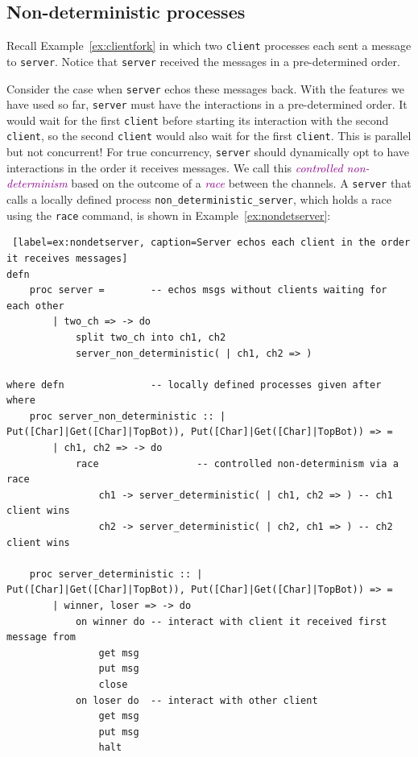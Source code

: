 \documentclass[acmsmall]{acmart}
\newcommand{\tc}[1]{\textcolor{darkMagenta}{\textit{#1}}}
\begin{document}
\subsection{Non-deterministic processes}
\label{Sec:races}

Recall Example~\ref{ex:clientfork} in which two \lstinline$client$ processes each sent a message to \lstinline$server$. 
Notice that \lstinline$server$ received the messages in a pre-determined order.

Consider the case when \lstinline$server$ echos these messages back.
With the features we have used so far, \lstinline$server$ must have the interactions in a pre-determined order.
It would wait for the first \lstinline$client$ before starting its interaction with the second \lstinline$client$, so the second \lstinline$client$ would also wait for the first \lstinline$client$. This is parallel but not concurrent!
For true concurrency, \lstinline$server$ should dynamically opt to have interactions in the order it receives messages. 
We call this \tc{controlled non-determinism} based on the outcome of a \tc{race} between the channels.
A \lstinline$server$ that calls a locally defined process \lstinline$non_deterministic_server$, which holds a race
using the \lstinline$race$ command, is shown in Example~\ref{ex:nondetserver}:
\begin{lstlisting} [label=ex:nondetserver, caption=Server echos each client in the order it receives messages]
defn
	proc server =		 -- echos msgs without clients waiting for each other
		| two_ch => -> do
			split two_ch into ch1, ch2
			server_non_deterministic( | ch1, ch2 => )

where defn				 -- locally defined processes given after where
	proc server_non_deterministic :: | 																		Put([Char]|Get([Char]|TopBot)), Put([Char]|Get([Char]|TopBot)) => =
		| ch1, ch2 => -> do
			race				 -- controlled non-determinism via a race
				ch1 -> server_deterministic( | ch1, ch2 => ) -- ch1 client wins
				ch2 -> server_deterministic( | ch2, ch1 => ) -- ch2 client wins
	
	proc server_deterministic :: | 																				Put([Char]|Get([Char]|TopBot)), Put([Char]|Get([Char]|TopBot)) => =
		| winner, loser => -> do
			on winner do -- interact with client it received first message from
				get msg
				put msg
				close
			on loser do	 -- interact with other client
				get msg
				put msg
				halt
\end{lstlisting}
\end{document}
